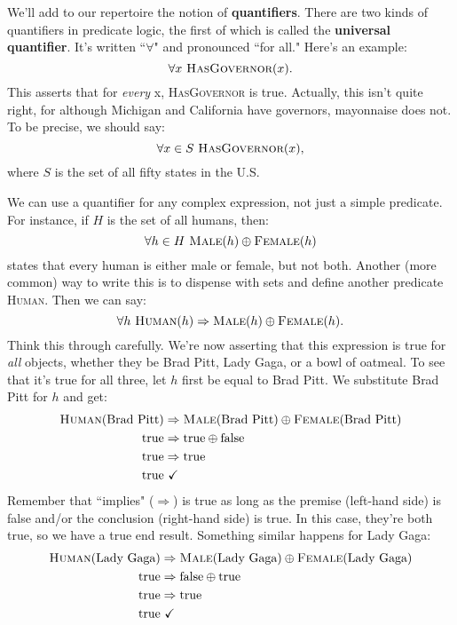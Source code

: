 We'll add to our repertoire the notion of \textbf{quantifiers}. There are
two kinds of quantifiers in predicate logic, the first of which is called
the \textbf{universal quantifier}. It's written ``$\forall$" and pronounced
``for all." Here's an example:
\[
\forall x\ \textsc{HasGovernor}(x).
\]
This asserts that for \textit{every} x, \textsc{HasGovernor} is true.
Actually, this isn't quite right, for although Michigan and California have
governors, mayonnaise does not. To be precise, we should say:
\[
\forall x\in S\ \textsc{HasGovernor}(x),
\]
where $S$ is the set of all fifty states in the U.S.

We can use a quantifier for any complex expression, not just a simple
predicate. For instance, if $H$ is the set of all humans, then:
\[
\forall h\in H\ \textsc{Male}(h) \oplus \textsc{Female}(h)
\]
states that every human is either male or female, but not both. Another
(more common) way to write this is to dispense with sets and define another
predicate \textsc{Human}. Then we can say:
\[
\forall h\ \textsc{Human}(h) \Rightarrow \textsc{Male}(h) \oplus
\textsc{Female}(h).
\]
Think this through carefully. We're now asserting that this expression is
true for \textit{all} objects, whether they be Brad Pitt, Lady Gaga, or a
bowl of oatmeal. To see that it's true for all three, let $h$ first be
equal to Brad Pitt. We substitute Brad Pitt for $h$ and get:
\begin{align*}
\textsc{Human}(\text{Brad Pitt}) & \Rightarrow \textsc{Male}(\text{Brad Pitt}) \oplus \textsc{Female}(\text{Brad Pitt}) \\
\text{true} & \Rightarrow \text{true} \oplus \text{false} \\
\text{true} & \Rightarrow \text{true} \\
\text{true} & \ \checkmark
\end{align*}
Remember that ``implies" ($\Rightarrow$) is true as long as the premise
(left-hand side) is false and/or the conclusion (right-hand side) is true.
In this case, they're both true, so we have a true end result. Something
similar happens for Lady Gaga:
\begin{align*}
\textsc{Human}(\text{Lady Gaga}) & \Rightarrow \textsc{Male}(\text{Lady Gaga}) \oplus \textsc{Female}(\text{Lady Gaga}) \\
\text{true} & \Rightarrow \text{false} \oplus \text{true} \\
\text{true} & \Rightarrow \text{true} \\
\text{true} & \ \checkmark
\end{align*}
